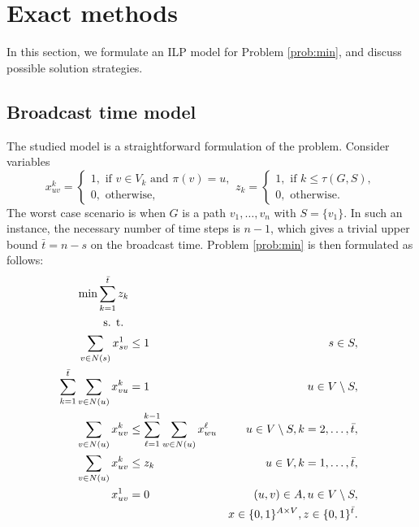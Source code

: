\section{Exact methods} \label{sec:exact}


In this section, we formulate an ILP model for Problem \ref{prob:min}, and discuss possible solution strategies. 

\subsection{Broadcast time model}
The studied model is a straightforward formulation of the problem.
Consider variables 
$$ x_{uv}^k=
\begin{cases} 
1, \text{ if } v\in V_k \text{ and } \pi(v)=u,\\ 
0, \text{ otherwise},
\end{cases}
z_{k}=\begin{cases}
1, \text{ if } k\leq\tau(G,S),\\
0, \text{ otherwise}.
\end{cases}
$$
The worst case scenario is when $G$ is a path $v_1,\dots,v_n$ with $S=\{v_1\}$. 
In such an instance, the necessary number of time steps is $n-1$, which gives a trivial upper bound $\bar{t}=n-s$ on the broadcast time.
Problem \ref{prob:min} is then formulated as follows: 
\begin{subequations}\label{mod:basic}
\begin{align}
\label{mod:basic:obj} \min \sum\limits_{k=1}^{\bar{t}}z_k \\ 
\notag \text{s. t. } \\
\label{mod:basic:onefromroot} \sum_{v \in N(s)}x^1_{sv} & \leq 1 & s\in S,\\
\label{mod:basic:singlein} \sum\limits_{k=1}^{\bar{t}}\sum\limits_{v\in N(u)}x_{vu}^k & = 1 & u\in V \setminus S,\\
\label{mod:basic:tIncreases} \sum\limits_{v\in N(u)}x_{uv}^k &\leq\sum\limits_{\ell=1}^{k-1}\sum\limits_{w\in N(u)} x_{wu}^{\ell}  & u\in V\setminus S, k=2,\dots,\bar{t},\\
\label{mod:basic:tcrel} \sum\limits_{v\in N(u)}x_{uv}^k & \leq z_k &  u\in V,k=1,\dots,\bar{t},\\
\label{mod:basic:positiveCost}x_{uv}^1 & = 0 & (u,v)\in A, u \in V\setminus S,\\
\label{mod:basic:dim}&&x \in \{0,1\}^{A\times V},z\in\{0,1\}^{\bar{t}}.
\end{align}~
\end{subequations}
